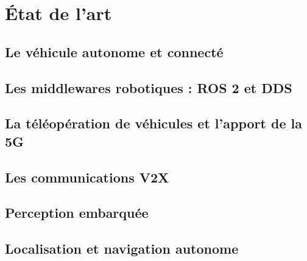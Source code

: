 \chapter{État de l'art}
\chapminitoc

\section{Le véhicule autonome et connecté}

\section{Les middlewares robotiques : ROS 2 et DDS}

\section{La téléopération de véhicules et l'apport de la 5G}

\section{Les communications V2X}

\section{Perception embarquée}

\section{Localisation et navigation autonome}

